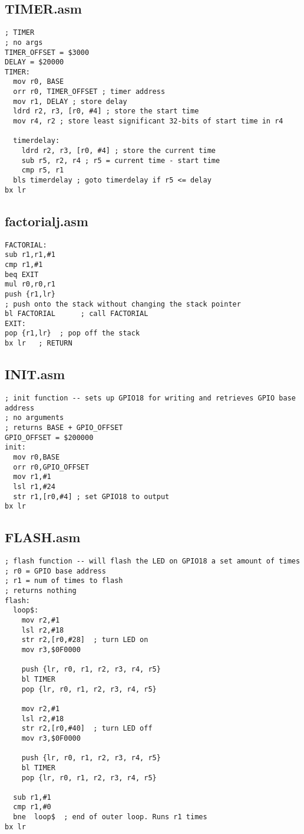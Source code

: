 \documentclass[11pt]{scrartcl}
\begin{document}
\subsection*{TIMER.asm}
\begin{verbatim}
; TIMER
; no args
TIMER_OFFSET = $3000
DELAY = $20000
TIMER:
  mov r0, BASE
  orr r0, TIMER_OFFSET ; timer address
  mov r1, DELAY ; store delay
  ldrd r2, r3, [r0, #4] ; store the start time
  mov r4, r2 ; store least significant 32-bits of start time in r4
  
  timerdelay:
    ldrd r2, r3, [r0, #4] ; store the current time
    sub r5, r2, r4 ; r5 = current time - start time
    cmp r5, r1
  bls timerdelay ; goto timerdelay if r5 <= delay
bx lr
\end{verbatim}

\subsection*{factorialj.asm}
\begin{verbatim}
FACTORIAL:
sub r1,r1,#1
cmp r1,#1
beq EXIT
mul r0,r0,r1
push {r1,lr}
; push onto the stack without changing the stack pointer
bl FACTORIAL	  ; call FACTORIAL
EXIT:
pop {r1,lr}  ; pop off the stack
bx lr	; RETURN
\end{verbatim}

\subsection*{INIT.asm}
\begin{verbatim}
; init function -- sets up GPIO18 for writing and retrieves GPIO base address
; no arguments
; returns BASE + GPIO_OFFSET
GPIO_OFFSET = $200000
init:
  mov r0,BASE
  orr r0,GPIO_OFFSET
  mov r1,#1
  lsl r1,#24
  str r1,[r0,#4] ; set GPIO18 to output
bx lr
\end{verbatim}

\subsection*{FLASH.asm}
\begin{verbatim}
; flash function -- will flash the LED on GPIO18 a set amount of times
; r0 = GPIO base address
; r1 = num of times to flash
; returns nothing
flash:
  loop$:
    mov r2,#1
    lsl r2,#18
    str r2,[r0,#28]  ; turn LED on
    mov r3,$0F0000

    push {lr, r0, r1, r2, r3, r4, r5}
    bl TIMER
    pop {lr, r0, r1, r2, r3, r4, r5}
    
    mov r2,#1
    lsl r2,#18
    str r2,[r0,#40]  ; turn LED off
    mov r3,$0F0000

    push {lr, r0, r1, r2, r3, r4, r5}
    bl TIMER
    pop {lr, r0, r1, r2, r3, r4, r5}

  sub r1,#1
  cmp r1,#0
  bne  loop$  ; end of outer loop. Runs r1 times
bx lr
\end{verbatim}
\end{document}
